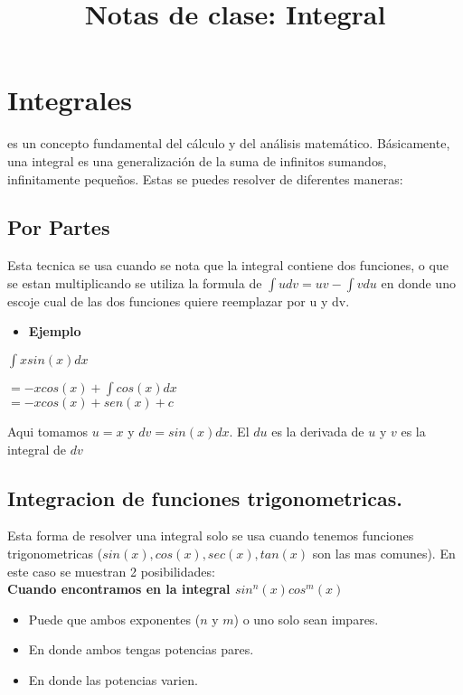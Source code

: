 \documentclass[12pt]{article}
\title{Notas de clase: Integral}
\begin{document}
\maketitle

\section{Integrales}
es un concepto fundamental del cálculo y del análisis matemático. 
Básicamente, una integral es una generalización de la suma de infinitos sumandos, infinitamente pequeños.
Estas se puedes resolver de diferentes maneras:

\subsection{Por Partes}
Esta tecnica se usa cuando se nota que la integral contiene dos funciones, o que se estan multiplicando 
se utiliza la formula de $\int u dv = u v - \int v du $ en donde uno escoje cual de las dos funciones quiere reemplazar por u y dv.\\

\begin{itemize}
 \item \textbf{Ejemplo}
\end{itemize}



$\int x sin(x) dx$ 
\begin{center}
 $ =-xcos(x)+ \int cos(x)dx$ \\ $ = -xcos(x)+ sen(x) + c$ \\
\end{center}




Aqui tomamos $u=x$ y $dv = sin(x)dx$. El $du$ es la derivada de $u$ y $v$ es la integral de $dv$

\subsection{Integracion de funciones trigonometricas.}
Esta forma de resolver una integral solo se usa cuando tenemos funciones trigonometricas ($sin(x), cos(x), sec(x), tan(x)$ son las mas comunes). En este caso se muestran 2 posibilidades:\\

\textbf{Cuando encontramos en la integral $sin^n(x) cos^m (x)$}\\

\begin{itemize}
 \item Puede que ambos exponentes ($n$ y $m$) o uno solo sean impares.
 \item En donde ambos tengas potencias pares.
 \item En donde las potencias varien.\\
\end{itemize}
\end{document}

